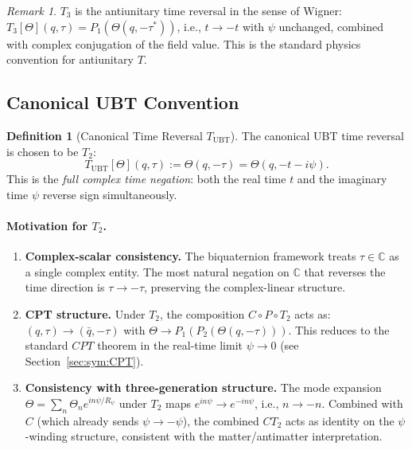 \documentclass[12pt,a4paper]{article}
\theoremstyle{definition}
\newtheorem{definition}[theorem]{Definition}
\theoremstyle{remark}
\newtheorem{remark}[theorem]{Remark}
\begin{document}
\begin{remark}
$T_3$ is the antiunitary time reversal in the sense of Wigner:
$T_3[\Theta](q,\tau) = P_1(\Theta(q, -\tau^*))$,
i.e., $t \to -t$ with $\psi$ unchanged, combined with complex conjugation of
the field value.  This is the standard physics convention for antiunitary $T$.
\end{remark}

\subsection{Canonical UBT Convention}

\begin{definition}[Canonical Time Reversal $T_{\mathrm{UBT}}$]
\label{def:sym:T_UBT}
The canonical UBT time reversal is chosen to be $T_2$:
\begin{equation}
  T_{\mathrm{UBT}}[\Theta](q,\tau)
  := \Theta(q, -\tau)
  = \Theta(q, -t - i\psi).
  \label{eq:sym:T_UBT}
\end{equation}
This is the \emph{full complex time negation}: both the real time $t$ and the
imaginary time $\psi$ reverse sign simultaneously.
\end{definition}

\paragraph{Motivation for $T_2$.}
\begin{enumerate}
  \item \textbf{Complex-scalar consistency.}
    The biquaternion framework treats $\tau \in \mathbb{C}$ as a single
    complex entity.  The most natural negation on $\mathbb{C}$ that reverses
    the time direction is $\tau \to -\tau$, preserving the complex-linear
    structure.
  \item \textbf{CPT structure.}
    Under $T_2$, the composition $C \circ P \circ T_2$ acts as:
    $(q,\tau) \to (\bar{q}, -\tau)$ with
    $\Theta \to P_1(P_2(\Theta(q, -\tau)))$.
    This reduces to the standard $CPT$ theorem in the real-time limit
    $\psi \to 0$ (see Section~\ref{sec:sym:CPT}).
  \item \textbf{Consistency with three-generation structure.}
    The mode expansion $\Theta = \sum_n \Theta_n e^{in\psi/R_\psi}$ under
    $T_2$ maps $e^{in\psi} \to e^{-in\psi}$, i.e., $n \to -n$.
    Combined with $C$ (which already sends $\psi \to -\psi$), the combined
    $CT_2$ acts as identity on the $\psi$-winding structure, consistent with
    the matter/antimatter interpretation.
\end{enumerate}
\end{document}
